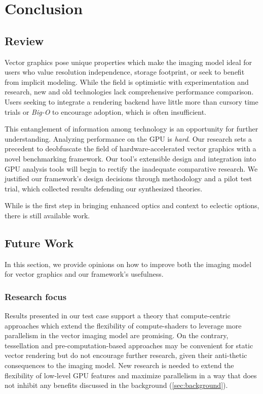 \section{Conclusion}

\subsection{Review}\label{sec:conclusion}
Vector graphics pose unique properties which make the imaging model ideal for users who value resolution independence, storage footprint, or seek to benefit from implicit modeling. While the field is optimistic with experimentation and research, new and old technologies lack comprehensive performance comparison. Users seeking to integrate a rendering backend have little more than cursory time trials or \emph{Big-O} to encourage adoption, which is often insufficient.\medskip

This entanglement of information among technology is an opportunity for further understanding. Analyzing performance on the GPU is \emph{hard}. Our research sets a precedent to deobfuscate the field of hardware-accelerated vector graphics with a novel benchmarking framework. Our tool's extensible design and integration into GPU analysis tools will begin to rectify the inadequate comparative research. We justified our framework's design decisions through methodology and a pilot test trial, which collected results defending our synthesized theories.\medskip

While \toollinkedname is the first step in bringing enhanced optics and context to eclectic options, there is still available work.\medskip

\subsection{Future Work}\label{sec:future_work}

In this section, we provide opinions on how to improve both the imaging model for vector graphics and our framework's usefulness.

\subsubsection{Research focus}
Results presented in our test case support a theory that compute-centric approaches which extend the flexibility of compute-shaders to leverage more parallelism in the vector imaging model are promising. On the contrary, tessellation and pre-computation-based approaches may be convenient for static vector rendering but do not encourage further research, given their anti-thetic consequences to the imaging model. New research is needed to extend the flexibility of low-level GPU features and maximize parallelism in a way that does not inhibit any benefits discussed in the background (\cref{sec:background}).

